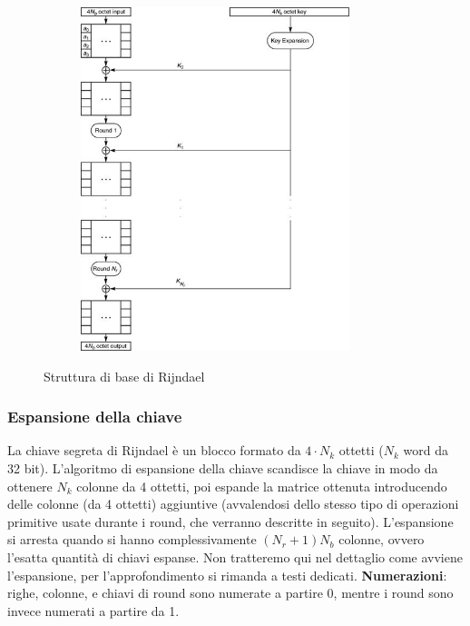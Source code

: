 \begin{figure}[htbp]
	\centering%
	\subfigure%
	{\includegraphics[height=10cm, width=10cm, keepaspectratio]{Immagini/chiave_segreta/rijndael_struttura.png}}
	\caption{Struttura di base di Rijndael \label{fig:Rij_struct}} 	
\end{figure}

\subsubsection{Espansione della chiave}
La chiave segreta di Rijndael è un blocco formato da $4 \cdot N_{k}$ ottetti ($N_{k}$ word da 32 bit). L'algoritmo di espansione della chiave scandisce la chiave in modo da ottenere $N_{k}$ colonne da 4 ottetti, poi espande la matrice ottenuta introducendo delle colonne (da 4 ottetti) aggiuntive (avvalendosi dello stesso tipo di operazioni primitive usate durante i round, che verranno descritte in seguito). L'espansione si arresta quando si hanno complessivamente $(N_{r} + 1)N_{b}$ colonne, ovvero l'esatta quantità di chiavi espanse. Non tratteremo qui nel dettaglio come avviene l'espansione, per l'approfondimento si rimanda a testi dedicati.
\newline \newline
\textbf{Numerazioni}: righe, colonne, e chiavi di round sono numerate a
partire 0, mentre i round sono invece numerati a partire da 1.

